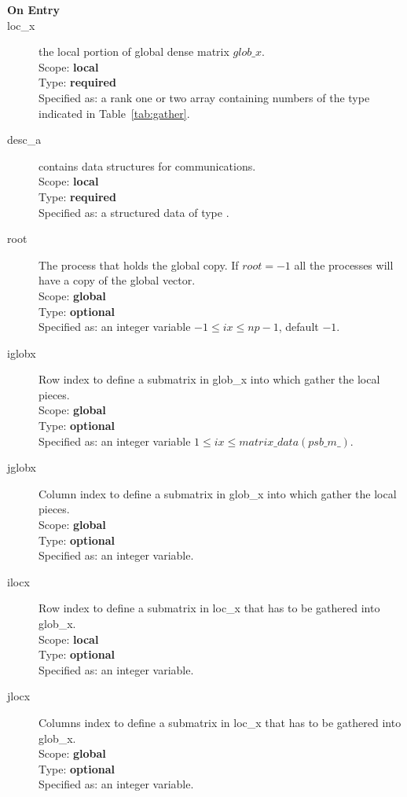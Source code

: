 \begin{description}
\item[\bf On Entry]
\item[loc\_x] the local portion of global dense matrix
$glob\_x$. \\
Scope: {\bf local} \\
Type: {\bf required}\\
Specified as: a rank one or two array containing numbers of the type
indicated in Table~\ref{tab:gather}.
\item[desc\_a] contains data structures for communications.\\
Scope: {\bf local} \\
Type: {\bf required}\\
Specified as: a structured data of type \descdata.
\item[root]  The process that holds the global copy. If $root=-1$ all
  the processes will have a copy of the global vector.\\
Scope: {\bf global} \\
Type: {\bf optional}\\
Specified as: an integer variable $-1\le ix\le np-1$, default $-1$. 
\item[iglobx]  Row index to define a submatrix in glob\_x into which
  gather the local pieces.\\
Scope: {\bf global} \\
Type: {\bf optional}\\
Specified as: an integer variable $1\le ix\le matrix\_data(psb\_m\_)$. 
\item[jglobx]  Column index to define a submatrix in glob\_x into which
  gather the local pieces.\\
Scope: {\bf global} \\
Type: {\bf optional}\\
Specified as: an integer variable. 
\item[ilocx]  Row index to define a submatrix in loc\_x that has to
  be gathered into glob\_x.\\
Scope: {\bf local} \\
Type: {\bf optional}\\
Specified as: an integer variable. 
\item[jlocx]  Columns index to define a submatrix in loc\_x that has
  to be gathered into glob\_x.\\
Scope: {\bf global} \\
Type: {\bf optional}\\
Specified as: an integer variable.

\end{description}
